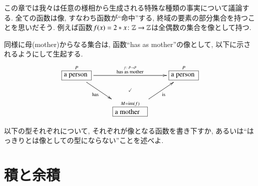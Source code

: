 この章では我々は任意の様相から生成される特殊な種類の事実について議論する. 全ての函数は像, すなわち函数が``命中''する, 終域の要素の部分集合を持つことを思いだそう. 例えば函数$f(x)=2*x\colon {\mathbb Z}\rightarrow{\mathbb Z}$は全偶数の集合を像として持つ.


同様に母(mother)からなる集合は, 函数``has as mother''の像として, 以下に示されるようにして生起する.
$$
\xymatrix{\obox{P}{.5in}{a person}\LAL{rd}{has}\LA{rr}{$\stackrel{f\taking P\to P}{\tn{has as mother}}$}&&\obox{P}{.5in}{a person}\\
&\obox{M=\im(f)}{.6in}{a mother}\LAL{ur}{is}\ar@{}[u]|(.6){\checkmark}
}$$

\begin{exercise}
以下の型それぞれについて, それぞれが像となる函数を書き下すか, あるいは``はっきりとは像としての型にならない''ことを述べよ.
\sexc {}
\next {}
\next {}
\next {}
\next {}
\next {}
\endsexc
\end{exercise}



\section{積と余積}\label{sec:prods and coprods in set}


